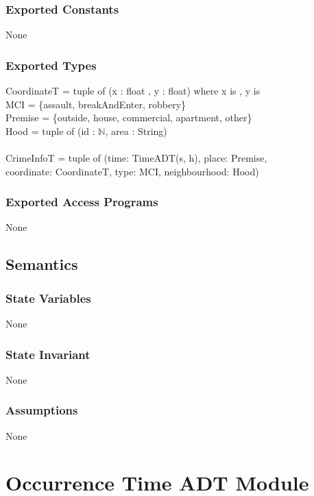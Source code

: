 \documentclass[12pt]{article}
\begin{document}
\subsubsection* {Exported Constants}

None

\subsubsection* {Exported Types}

CoordinateT = tuple of (x : float , y : float)     where x is , y is \\
MCI = \{assault, breakAndEnter, robbery\}\\ 
Premise = \{outside, house, commercial, apartment, other\}\\
Hood =  tuple of  (id : $\mathbb{N}$, area : String)\\
~\\
CrimeInfoT = tuple of (time: TimeADT(s, h), place: Premise, \\
coordinate: CoordinateT, type: MCI, neighbourhood: Hood)

\subsubsection* {Exported Access Programs}

None

\subsection* {Semantics}

\subsubsection* {State Variables}

None

\subsubsection* {State Invariant}

None

\subsubsection* {Assumptions}

None

\newpage

\section* {Occurrence Time ADT Module}
\end{document}
